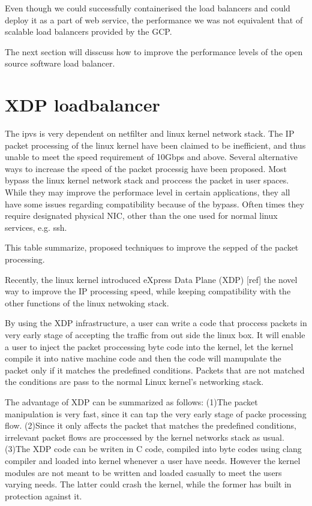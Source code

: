 Even though we could successfully containerised the load balancers and could deploy it as a part of web service, the performance we was not equivalent that of scalable load balancers provided by the GCP.

The next section will disscuss how to improve the performance levels of the open source software load balancer. 

\section{XDP loadbalancer}\label{XDP loadbalancer}
The ipvs is very dependent on netfilter and linux kernel network stack.
The IP packet processing of the linux kernel have been claimed to be inefficient, and thus unable to meet the speed requirement of 10Gbps and above.
Several alternative ways to increase the speed of the packet processig have been proposed.
Most bypass the linux kernel network stack and proccess the packet in user spaces.
While they may improve the performace level in certain applications, they all have some issues regarding compatibility because of the bypass.
Often times they require designated physical NIC, other than the one used for normal linux services, e.g. ssh.

This table summarize, proposed techniques to improve the sepped of the packet processing.

Recently, the linux kernel introduced eXpress Data Plane (XDP) [ref] the novel way to improve the IP processing speed, while keeping compatibility with the other functions of the linux netwoking stack.

By using the XDP infrastructure, a user can write a code that proccess packets in very early stage of accepting the traffic from out side the linux box.
It will enable a user to inject the packet proccessing byte code into the kernel, let the kernel compile it into native machine code and then the code will manupulate the packet only if it matches the predefined conditions.
Packets that are not matched the conditions are pass to the normal Linux kernel's networking stack.

The advantage of XDP can be summarized as follows:
(1)The packet manipulation is very fast, since it can tap the very early stage of packe processing flow.
(2)Since it only affects the packet that matches the predefined conditions, irrelevant packet flows are proccessed by the kernel networks stack as usual.
(3)The XDP code can be writen in C code, compiled into byte codes using clang compiler and loaded into kernel whenever a user have needs.
However the kernel modules are not meant to be written and loaded casually to meet the users varying needs.
The latter could crash the kernel, while the former has built in protection against it.

